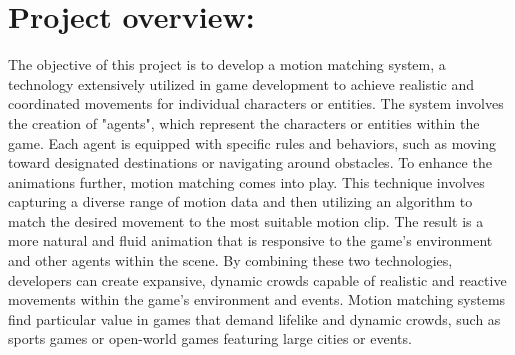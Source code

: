 \documentclass[12pt]{book}
\begin{document}
\section{Project overview:}
The objective of this project is to develop a motion matching system, a technology extensively utilized in game development to achieve
realistic and coordinated movements for individual characters or entities. The system involves the creation of "agents",
which represent the characters or entities within the game. Each agent is equipped with specific rules and behaviors,
such as moving toward designated destinations or navigating around obstacles. To enhance the animations further, motion matching
comes into play. This technique involves capturing a diverse range of motion data and then utilizing an algorithm to match the desired
movement to the most suitable motion clip. The result is a more natural and fluid animation that is responsive to the game's environment
and other agents within the scene. By combining these two technologies, developers can create expansive, dynamic crowds capable of realistic
and reactive movements within the game's environment and events. Motion matching systems find particular value in games that demand lifelike
and dynamic crowds, such as sports games or open-world games featuring large cities or events.
\end{document}
